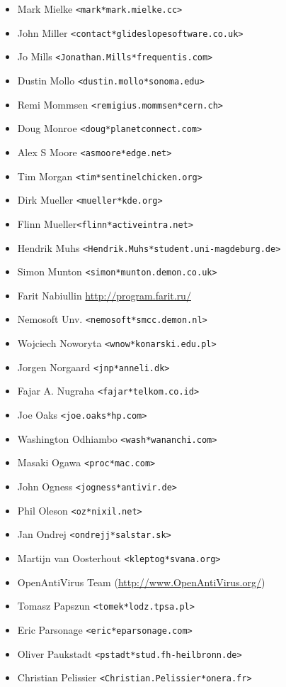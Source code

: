 \documentclass[a4paper,titlepage,12pt]{article}
\newcommand{\email}[1]{\texttt{#1}}
\begin{document}
\begin{itemize}
	\item Mark Mielke \email{<mark*mark.mielke.cc>}
	\item John Miller \email{<contact*glideslopesoftware.co.uk>}
	\item Jo Mills \email{<Jonathan.Mills*frequentis.com>}
	\item Dustin Mollo \email{<dustin.mollo*sonoma.edu>}
	\item Remi Mommsen \email{<remigius.mommsen*cern.ch>}
	\item Doug Monroe \email{<doug*planetconnect.com>}
	\item Alex S Moore \email{<asmoore*edge.net>}
	\item Tim Morgan \email{<tim*sentinelchicken.org>}
	\item Dirk Mueller \email{<mueller*kde.org>}
	\item Flinn Mueller\email{<flinn*activeintra.net>}
	\item Hendrik Muhs \email{<Hendrik.Muhs*student.uni-magdeburg.de>}
	\item Simon Munton \email{<simon*munton.demon.co.uk>}
	\item Farit Nabiullin \url{http://program.farit.ru/}
	\item Nemosoft Unv. \email{<nemosoft*smcc.demon.nl>}
	\item Wojciech Noworyta \email{<wnow*konarski.edu.pl>}
	\item Jorgen Norgaard \email{<jnp*anneli.dk>}
	\item Fajar A. Nugraha \email{<fajar*telkom.co.id>}
	\item Joe Oaks \email{<joe.oaks*hp.com>}
	\item Washington Odhiambo \email{<wash*wananchi.com>}
	\item Masaki Ogawa \email{<proc*mac.com>}
	\item John Ogness \email{<jogness*antivir.de>}
	\item Phil Oleson \email{<oz*nixil.net>}
	\item Jan Ondrej \email{<ondrejj*salstar.sk>}
	\item Martijn van Oosterhout \email{<kleptog*svana.org>}
	\item OpenAntiVirus Team (\url{http://www.OpenAntiVirus.org/})
	\item Tomasz Papszun \email{<tomek*lodz.tpsa.pl>}
	\item Eric Parsonage \email{<eric*eparsonage.com>}
	\item Oliver Paukstadt \email{<pstadt*stud.fh-heilbronn.de>}
	\item Christian Pelissier \email{<Christian.Pelissier*onera.fr>}

\end{itemize}
\end{document}
